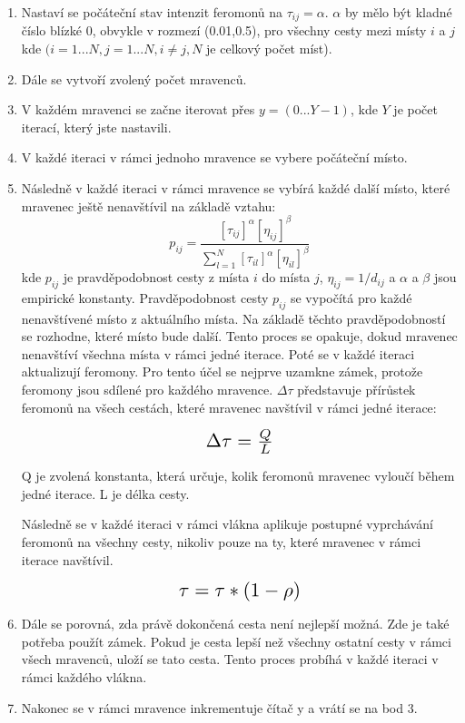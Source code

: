 \begin{enumerate}
\item Nastaví se počáteční stav intenzit feromonů na $\tau_{ij} = \alpha$. $\alpha$ by mělo být kladné číslo blízké 0, obvykle v rozmezí (0.01,0.5), pro všechny cesty mezi místy $i$ a $j$ kde $(i = 1...N,j = 1...N, i \neq j, N$ je celkový počet míst).
\item Dále se vytvoří zvolený počet mravenců.
\item V každém mravenci se začne iterovat přes $y = (0...Y-1)$, kde $Y$ je počet iterací, který jste nastavili.
\item V každé iteraci v rámci jednoho mravence se vybere počáteční místo.
\item Následně v každé iteraci v rámci mravence se vybírá každé další místo, které mravenec ještě nenavštívil na základě vztahu:
\begin{equation*}
p_{ij}=\frac{\left[\tau_{ij}\right]^\alpha\left[\eta_{ij}\right]^\beta}{\sum_{l=1}^{N}\left[\tau_{il}\right]^\alpha\left[\eta_{il}\right]^\beta}
\end{equation*}
kde $p_{ij}$ je pravděpodobnost cesty z místa $i$ do místa $j$, $\eta_{ij} = 1/d_{ij}$ a $\alpha$ a $\beta$ jsou empirické konstanty. Pravděpodobnost cesty $p_{ij}$ se vypočítá pro každé nenavštívené místo z aktuálního místa. Na základě těchto pravděpodobností se rozhodne, které místo bude další. Tento proces se opakuje, dokud mravenec nenavštíví všechna místa v rámci jedné iterace. Poté se v každé iteraci aktualizují feromony. Pro tento účel se nejprve uzamkne zámek, protože feromony jsou sdílené pro každého mravence. $\Delta \tau$ představuje přírůstek feromonů na všech cestách, které mravenec navštívil v rámci jedné iterace:

\begin{equation*}
\scalebox{1.5}{$\Delta \tau = \frac{Q}{L}$}
\end{equation*}

Q je zvolená konstanta, která určuje, kolik feromonů mravenec vyloučí během jedné iterace. L je délka cesty.

Následně se v každé iteraci v rámci vlákna aplikuje postupné vyprchávání feromonů na všechny cesty, nikoliv pouze na ty, které mravenec v rámci iterace navštívil.

\begin{equation*}
    \scalebox{1.5}{$\tau = \tau*(1-\rho) $}
\end{equation*}

\item Dále se porovná, zda právě dokončená cesta není nejlepší možná. Zde je také potřeba použít zámek. Pokud je cesta lepší než všechny ostatní cesty v rámci všech mravenců, uloží se tato cesta. Tento proces probíhá v každé iteraci v rámci každého vlákna.
\item Nakonec se v rámci mravence inkrementuje čítač y a vrátí se na bod 3.

\end{enumerate}




